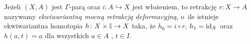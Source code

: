 Jeżeli $(X,A)$ jest $\Gamma$-parą oraz $i\colon A\hookrightarrow X$ jest włożeniem, to retrakcję \mbox{$r\colon X\to A$} nazywamy \textit{ekwiwariantną mocną retrakcją deformacyjną}, o~ile istnieje ekwiwariantna homotopia $h\colon X\times \mathbb{I}\to X$ taka, że $h_0=i\circ r$, $h_1=\operatorname{id}_X$ oraz $h(a,t)=a$ dla wszystkich $a\in A$ , $t\in I$.
